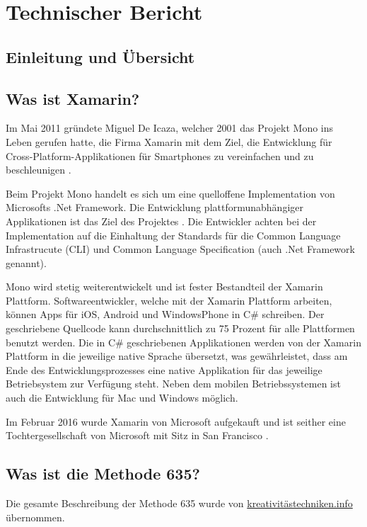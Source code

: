\section{Technischer Bericht}

\subsection{Einleitung und Übersicht}

\subsection{Was ist Xamarin?}
Im Mai 2011 gründete Miguel De Icaza, welcher 2001 das Projekt Mono ins Leben gerufen hatte, die Firma Xamarin mit dem Ziel, die Entwicklung für Cross-Platform-Applikationen für Smartphones zu vereinfachen und zu beschleunigen \cite{XamarinWikipedia}.

Beim Projekt Mono handelt es sich um eine quelloffene Implementation von Microsofts .Net Framework. Die Entwicklung plattformunabhängiger Applikationen ist das Ziel des Projektes \cite{XamarinCCVossel}. Die Entwickler achten bei der Implementation auf die Einhaltung der Standards für die Common Language Infrastrucute (CLI) und Common Language Specification (auch .Net Framework genannt)\cite{XamarinQuora}.

Mono wird stetig weiterentwickelt und ist fester Bestandteil der Xamarin Plattform. Softwareentwickler, welche mit der Xamarin Plattform arbeiten, können Apps für iOS, Android und WindowsPhone in C\# schreiben. Der geschriebene Quellcode kann durchschnittlich zu 75 Prozent für alle Plattformen benutzt werden. Die in C\# geschriebenen Applikationen werden von der Xamarin Plattform in die jeweilige native Sprache übersetzt, was gewährleistet, dass am Ende des Entwicklungsprozesses eine native Applikation für das jeweilige Betriebsystem zur Verfügung steht. Neben dem mobilen Betriebssystemen ist auch die Entwicklung für Mac und Windows möglich.\cite{XamarinCCVossel}

Im Februar 2016 wurde Xamarin von Microsoft aufgekauft und ist seither eine Tochtergesellschaft von Microsoft mit Sitz in San Francisco \cite{XamarinWikipedia}.


\subsection{Was ist die Methode 635?} \label{subsec:methode_635_desc}
Die gesamte Beschreibung der Methode 635 wurde von \href{https://kreativitätstechniken.info/6-3-5-methode/}{kreativitästechniken.info} \cite{methode-635} übernommen. 


